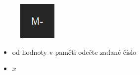 \documentclass[a4paper, 12pt]{article}
\begin{document}
\begin{minipage}{0.07\textwidth}
\begin{figure}[H]
\includegraphics[scale=0.7]{mminus.jpg}
\end{figure}
\end{minipage}
\begin{minipage}{1\textwidth}
\begin{itemize}
\item od hodnoty v paměti odečte zadané číslo
\item $x$  
\end{itemize}
\end{minipage}
\newline
\end{document}
